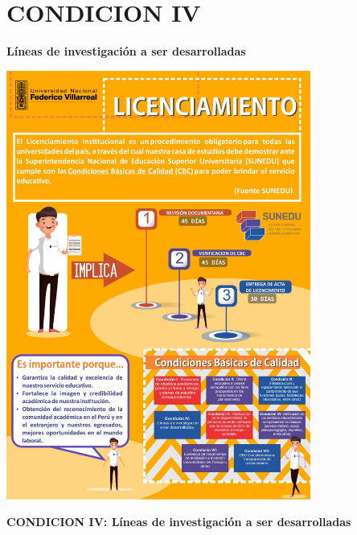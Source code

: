 \section{CONDICION IV} 
\textbf{Líneas de investigación a ser desarrolladas}
\vspace{5mm} %

\vspace{5mm} %
\begin{center}
\includegraphics[width=10cm]{./Imagenes/003}
\end{center}	
\vspace{7mm} %

\textbf{CONDICION IV: Líneas de investigación a ser desarrolladas}\\

